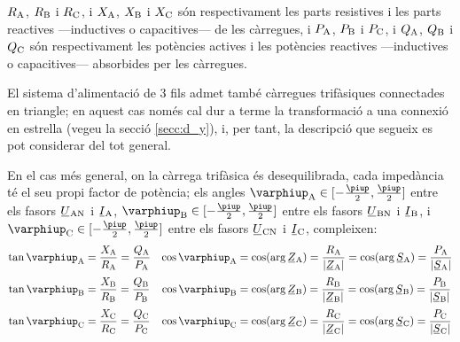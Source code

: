 $R_\mathrm{A}$, $R_\mathrm{B}$ i $R_\mathrm{C}$, i $X_\mathrm{A}$, $X_\mathrm{B}$ i
$X_\mathrm{C}$ són respectivament les parts resistives i les parts
reactives ---inductives o capacitives--- de les càrregues, i $P_\mathrm{A}$,
$P_\mathrm{B}$ i $P_\mathrm{C}$, i $Q_\mathrm{A}$, $Q_\mathrm{B}$ i $Q_\mathrm{C}$ són
respectivament les potències actives i les potències reactives
---inductives o capacitives--- absorbides per les càrregues.

El sistema d'alimentació de 3 fils admet també càrregues
trifàsiques connectades en triangle; en aquest cas només cal dur a
terme la transformació a una connexió en estrella (vegeu la secció
\ref{secc:d_y}), i, per tant, la descripció que segueix es pot
considerar del tot general.

\begin{center}
    
    \label{pic:pot_comp_trif}
\end{center}

En el cas més general, on la càrrega trifàsica és desequilibrada,
cada impedància té el seu propi factor de potència; els angles
$\varphiup\ped{A}\in[-\frac{\piup}{2},\frac{\piup}{2}]$ entre els fasors $\cmplx{U}\ped{AN}$ i $\cmplx{I}\ped{A}$, $\varphiup\ped{B}\in[-\frac{\piup}{2},\frac{\piup}{2}]$ entre els fasors $\cmplx{U}\ped{BN}$ i $\cmplx{I}\ped{B}$, i $\varphiup\ped{C}\in[-\frac{\piup}{2},\frac{\piup}{2}]$ entre els fasors $\cmplx{U}\ped{CN}$ i $\cmplx{I}\ped{C}$, compleixen:
\begin{subequations}
\begin{align}
    \tan\varphiup\ped{A} &= \frac{X\ped{A}}{R\ped{A}} = \frac{Q\ped{A}}{P\ped{A}} &
    \cos\varphiup\ped{A} &= \cos(\arg \cmplx{Z}\ped{A}) = \frac{R\ped{A}}{|\cmplx{Z}\ped{A}|} =  \cos(\arg \cmplx{S}\ped{A})  = \frac{P\ped{A}}{|\cmplx{S}\ped{A}|} \\[0.5ex]   
    \tan\varphiup\ped{B} &= \frac{X\ped{B}}{R\ped{B}} = \frac{Q\ped{B}}{P\ped{B}} &
    \cos\varphiup\ped{B} &= \cos(\arg \cmplx{Z}\ped{B}) = \frac{R\ped{B}}{|\cmplx{Z}\ped{B}|} = \cos(\arg \cmplx{S}\ped{B})  = \frac{P\ped{B}}{|\cmplx{S}\ped{B}|} \\[0.5ex]
    \tan\varphiup\ped{C} &= \frac{X\ped{C}}{R\ped{C}} = \frac{Q\ped{C}}{P\ped{C}} &  
    \cos\varphiup\ped{C} &= \cos(\arg \cmplx{Z}\ped{C}) = \frac{R\ped{C}}{|\cmplx{Z}\ped{C}|} = \cos(\arg \cmplx{S}\ped{C}) = \frac{P\ped{C}}{|\cmplx{S}\ped{C}|}
\end{align}
\end{subequations}

